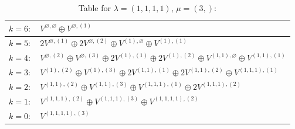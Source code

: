 \documentclass[a4paper,12pt]{article}
\begin{document}
\renewcommand{\arraystretch}{1.6} 
\begin{table}[H]
\centering
\caption{Table for $\lambda = (1, 1, 1, 1)$, $\mu = (3,)$:}
\begin{tabular}{|>{\centering\arraybackslash}p{15cm}|}
\hline
 $k = 6: \quad V^{\varnothing, \varnothing} \oplus V^{\varnothing, (1)} $ \\ \hline
 $k = 5: \quad 2 V^{\varnothing, (1)} \oplus 2 V^{\varnothing, (2)} \oplus V^{(1), \varnothing} \oplus V^{(1), (1)} $ \\ \hline
 $k = 4: \quad V^{\varnothing, (2)} \oplus V^{\varnothing, (3)} \oplus 2 V^{(1), (1)} \oplus 2 V^{(1), (2)} \oplus V^{(1, 1), \varnothing} \oplus V^{(1, 1), (1)} $ \\ \hline
 $k = 3: \quad V^{(1), (2)} \oplus V^{(1), (3)} \oplus 2 V^{(1, 1), (1)} \oplus 2 V^{(1, 1), (2)} \oplus V^{(1, 1, 1), (1)} $ \\ \hline
 $k = 2: \quad V^{(1, 1), (2)} \oplus V^{(1, 1), (3)} \oplus V^{(1, 1, 1), (1)} \oplus 2 V^{(1, 1, 1), (2)} $ \\ \hline
 $k = 1: \quad V^{(1, 1, 1), (2)} \oplus V^{(1, 1, 1), (3)} \oplus V^{(1, 1, 1, 1), (2)} $ \\ \hline
 $k = 0: \quad V^{(1, 1, 1, 1), (3)} $ \\ \hline
\end{tabular}
\end{table}
\end{document}
